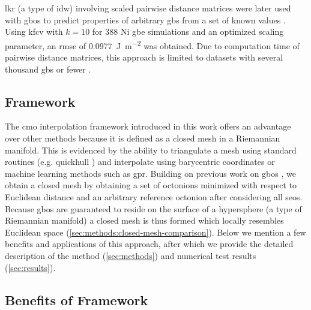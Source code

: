 \documentclass[preprint,12pt]{elsarticle}
\begin{document}
\Gls{lkr} (a type of \gls{idw}) involving scaled pairwise distance matrices were later used with \gls{gbo}s to predict properties of arbitrary \glspl{gb} from a set of known values \cite{chesserLearningGrainBoundary2020}. Using \gls{kfcv} with $k=10$ for \num{388} Ni \gls{gbe} simulations \cite{holmComparingGrainBoundary2010} and an optimized scaling parameter, an \gls{rmse} of \SI{0.0977}{\J\per\square\meter} was obtained. Due to computation time of pairwise distance matrices, this approach is limited to datasets with several thousand \glspl{gb} or fewer \cite{chesserLearningGrainBoundary2020}.

\subsection{ Framework}
The \gls{cmo} interpolation framework introduced in this work offers an advantage over other methods because it is defined as a closed mesh in a Riemannian manifold. This is evidenced by the ability to triangulate a mesh using standard routines (e.g. quickhull \cite{barberQuickhullAlgorithmConvex1996}) and interpolate using barycentric coordinates or machine learning methods such as \gls{gpr}. Building on previous work on \glspl{gbo} \cite{francisGeodesicOctonionMetric2019,chesserLearningGrainBoundary2020}, we obtain a closed mesh by obtaining a set of octonions minimized with respect to Euclidean distance and an arbitrary reference octonion after considering all \glspl{seo}. Because \glspl{gbo} are guaranteed to reside on the surface of a hypersphere \cite{francisGeodesicOctonionMetric2019} (a type of Riemannian manifold) a closed mesh is thus formed which locally resembles Euclidean space (\cref{sec:methods:closed-mesh-comparison}). Below we mention a few benefits and applications of this approach, after which we provide the detailed description of the method (\cref{sec:methods}) and numerical test results (\cref{sec:results}).

\subsection{Benefits of  Framework}
\end{document}
